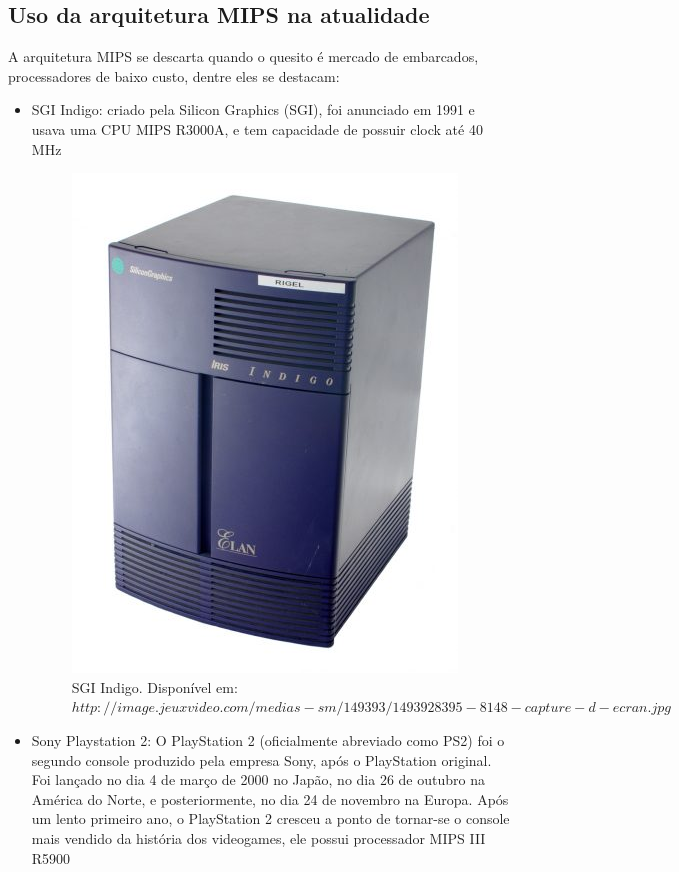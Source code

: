 \documentclass[12pt,a4paper]{article}
\begin{document}
\subsection{Uso da arquitetura MIPS na atualidade}
A arquitetura MIPS se descarta quando o quesito é mercado de embarcados, processadores de baixo custo, dentre eles se destacam:
\begin{itemize}
	\item SGI Indigo: criado pela Silicon Graphics (SGI), foi anunciado em 1991 e usava uma CPU MIPS R3000A, e tem capacidade de possuir clock até 40 MHz
	\begin{figure}[H]
		\includegraphics[scale=0.3]{HRmYIY.png}
		\centering
		\caption{SGI Indigo. Disponível em: \newline 				$http://image.jeuxvideo.com/medias-sm/149393/1493928395-8148-capture-d-ecran.jpg$}
	\end{figure}
	\item Sony Playstation 2: O PlayStation 2 (oficialmente abreviado como PS2) foi o segundo console produzido pela empresa Sony, após o PlayStation original. Foi lançado no dia 4 de março de 2000 no Japão, no dia 26 de outubro na América do Norte, e posteriormente, no dia 24 de novembro na Europa. Após um lento primeiro ano, o PlayStation 2 cresceu a ponto de tornar-se o console mais vendido da história dos videogames, ele possui processador MIPS III R5900

\end{itemize}
\end{document}
